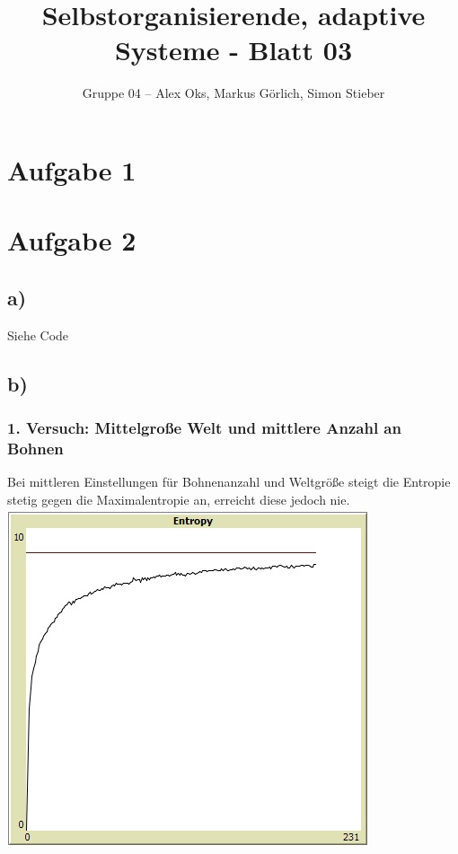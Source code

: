 \documentclass[10pt]{article}%
\theoremstyle{nonumberplain}
\begin{document}
\author{Gruppe 04 -- Alex Oks, Markus Görlich, Simon Stieber}
\title{Selbstorganisierende, adaptive Systeme - Blatt 03}

\maketitle %
\section{Aufgabe 1}

\section{Aufgabe 2}
\subsection{a)}
Siehe Code
\subsection{b)}
\subsubsection{1. Versuch: Mittelgroße Welt und mittlere Anzahl an Bohnen}
Bei mittleren Einstellungen für Bohnenanzahl und Weltgröße steigt die Entropie stetig gegen die Maximalentropie an, erreicht diese jedoch nie. \\
\includegraphics [scale = 0.85]{2-mittel.png}
\end{document}

